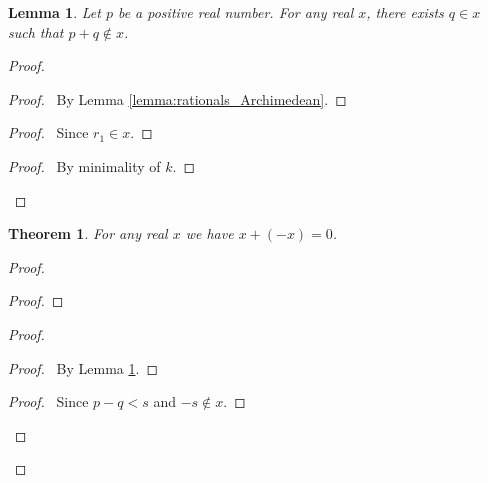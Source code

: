 \documentclass{article}
\let\qed\relax
\newtheorem{lemma}[axiom]{Lemma}
\newtheorem{theorem}[axiom]{Theorem}
\theoremstyle{definition}
\begin{document}
    \begin{lemma}
        \label{lemma:reals_pre_negation}
        Let $p$ be a positive real number. For any real $x$, there exists $q \in x$
        such that $p + q \notin x$.
    \end{lemma}

    \begin{proof}
        \pf
        \begin{proof}
            \pf\ By Lemma \ref{lemma:rationals_Archimedean}.
        \end{proof}
        \begin{proof}
            \pf\ Since $r_1 \in x$.
        \end{proof}
        \begin{proof}
            \pf\ By minimality of $k$.
        \end{proof}
        \qed
    \end{proof}

    \begin{theorem}
        For any real $x$ we have $x + (-x) = 0$.
    \end{theorem}

    \begin{proof}
        \pf
        \begin{proof}
        \end{proof}
        \begin{proof}
            \begin{proof}
                \pf\ By Lemma \ref{lemma:reals_pre_negation}.
            \end{proof}
            \begin{proof}
                \pf\ Since $p-q < s$ and $-s \notin x$.
            \end{proof}
        \end{proof}
        \qed
    \end{proof}
\end{document}
